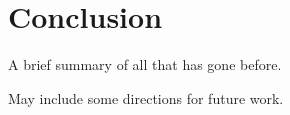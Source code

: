 
\chapter{Conclusion}

    A brief summary of all that has gone before.

    May include some directions for future work.
